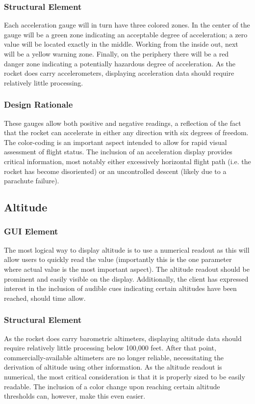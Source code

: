 \documentclass[journal,10pt,onecolumn,compsoc]{IEEEtran}
\begin{document}
		\subsubsection{Structural Element}
			Each acceleration gauge will in turn have three colored zones.
			In the center of the gauge will be a green zone indicating an acceptable degree of acceleration; a zero value will be located exactly in the middle.
			Working from the inside out, next will be a yellow warning zone.
			Finally, on the periphery there will be a red danger zone indicating a potentially hazardous degree of acceleration.
			As the rocket does carry accelerometers, displaying acceleration data should require relatively little processing.

		\subsubsection{Design Rationale}
			These gauges allow both positive and negative readings, a reflection of the fact that the rocket can accelerate in either any direction with six degrees of freedom.
			The color-coding is an important aspect intended to allow for rapid visual assessment of flight status.
			The inclusion of an acceleration display provides critical information, most notably either excessively horizontal flight path (i.e. the rocket has become disoriented) or an uncontrolled descent (likely due to a parachute failure).

	\subsection{Altitude}

		\subsubsection{GUI Element}
			The most logical way to display altitude is to use a numerical readout as this will allow users to quickly read the value (importantly this is the one parameter where actual value is the most important aspect).
			The altitude readout should be prominent and easily visible on the display.
			Additionally, the client has expressed interest in the inclusion of audible cues indicating certain altitudes have been reached, should time allow.

		\subsubsection{Structural Element}
			As the rocket does carry barometric altimeters, displaying altitude data should require relatively little processing below 100,000 feet.
			After that point, commercially-available altimeters are no longer reliable, necessitating the derivation of altitude using other information.
			As the altitude readout is numerical, the most critical consideration is that it is properly sized to be easily readable.
			The inclusion of a color change upon reaching certain altitude thresholds can, however, make this even easier.
			
\end{document}
